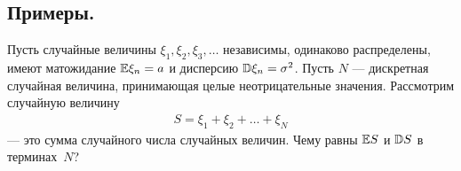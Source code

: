 \documentclass[../main.tex]{subfiles}
\begin{document}
\subsection{Примеры.}

\begin{exmpl}
 Пусть случайные величины $ \xi_1, \xi_2, \xi_3, \ldots $ независимы, одинаково распределены, имеют матожидание $ \mathbb E\xi_n = a $ и дисперсию $ \mathbb D\xi_n = \sigma^{2} $. Пусть $ N $ --- дискретная случайная величина, принимающая целые неотрицательные значения. Рассмотрим случайную величину
 \begin{align*}
  S = \xi_1  + \xi_2 + \ldots + \xi_N
 \end{align*} --- это сумма случайного числа случайных величин. Чему равны $ \mathbb E S $ и $ \mathbb D S $ в терминах~$ N $?


\end{exmpl}
\end{document}
